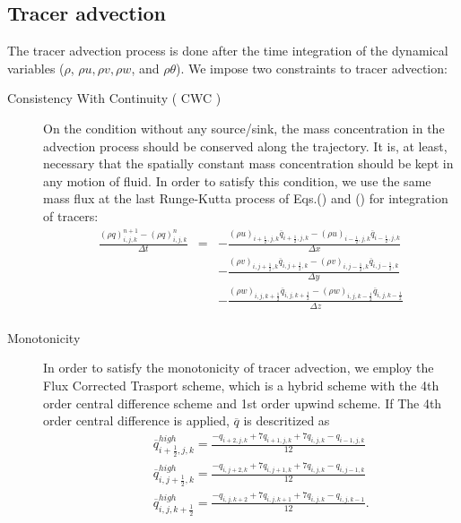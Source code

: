 \subsection{Tracer advection}
The tracer advection process is done after the time integration of
the dynamical variables ($\rho$, $\rho u,\rho v,\rho w$, and $\rho \theta$).
We impose two constraints to tracer advection:
\begin{description}
\item[Consistency With Continuity ( CWC )]
On the condition without any source/sink,
the mass concentration in the advection process
should be conserved along the trajectory.
It is, at least, necessary that
the spatially constant mass concentration should be kept
in any motion of fluid.
In order to satisfy this condition, we use the same mass flux at the last Runge-Kutta
process of Eqs.() and () for integration of tracers:
\begin{eqnarray}
\frac{\left(\rho q\right)^{n+1}_{i,j,k} - \left(\rho q\right)^{n}_{i,j,k}}{\Delta t}
&=& - \frac{(\rho u)_{i+\frac{1}{2},j,k} \overline{q}_{i+\frac{1}{2},j,k}
           -(\rho u)_{i-\frac{1}{2},j,k} \overline{q}_{i-\frac{1}{2},j,k}}
     {\Delta x}\nonumber\\
& &  - \frac{(\rho v)_{i,j+\frac{1}{2},k} \overline{q}_{i,j+\frac{1}{2},k}
           -(\rho v)_{i,j-\frac{1}{2},k} \overline{q}_{i,j-\frac{1}{2},k}}
     {\Delta y}\nonumber\\
& &  - \frac{(\rho w)_{i,j,k+\frac{1}{2}} \overline{q}_{i,j,k+\frac{1}{2}}
           -(\rho w)_{i,j,k-\frac{1}{2}} \overline{q}_{i,j,k-\frac{1}{2}}}
     {\Delta z}\nonumber\\
\label{eq:tracer_int}
\end{eqnarray}
\item[Monotonicity]
In order to satisfy the monotonicity of tracer advection,
we employ the Flux Corrected Trasport scheme, which is a hybrid scheme
with the 4th order central difference scheme and 1st order upwind scheme.
If The 4th order central difference is applied,
$\overline{q}$ is descritized as
\begin{eqnarray}
&& \overline{q}_{i+\frac{1}{2},j,k}^{high} =
\frac{-q_{i+2,j,k}+7q_{i+1,j,k}+7q_{i,j,k}-q_{i-1,j,k}}{12}\\
&& \overline{q}_{i,j+\frac{1}{2},k}^{high} =
\frac{-q_{i,j+2,k}+7q_{i,j+1,k}+7q_{i,j,k}-q_{i,j-1,k}}{12}\\
&& \overline{q}_{i,j,k+\frac{1}{2}}^{high} =
\frac{-q_{i,j,k+2}+7q_{i,j,k+1}+7q_{i,j,k}-q_{i,j,k-1}}{12}.
\end{eqnarray}

\end{description}
